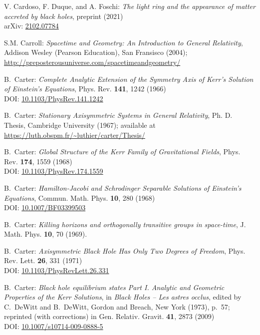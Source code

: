 \begin{thebibliography}{123}
V. Cardoso, F. Duque, and A. Foschi:
{\em The light ring and the appearance of matter accreted by black holes},
preprint (2021)\\
arXiv: \href{https://arxiv.org/abs/2102.07784}{2102.07784}

S.M. Carroll: \emph{Spacetime and Geometry: An Introduction to General Relativity},
Addison Wesley (Pearson Education), San Fransisco (2004); \\
\url{http://preposterousuniverse.com/spacetimeandgeometry/}

B.~Carter:
{\em Complete Analytic Extension of the Symmetry Axis of Kerr's Solution of Einstein's Equations},
Phys. Rev. {\bf 141}, 1242 (1966)\\
DOI: \href{https://doi.org/10.1103/PhysRev.141.1242}{10.1103/PhysRev.141.1242}

B.~Carter: {\em Stationary Axisymmetric Systems in General Relativity},
Ph. D. Thesis, Cambridge University (1967); available at\\
\url{https://luth.obspm.fr/~luthier/carter/Thesis/}

B.~Carter:
{\em Global Structure of the Kerr Family of Gravitational Fields},
Phys. Rev. {\bf 174}, 1559 (1968)\\
DOI: \href{https://doi.org/10.1103/PhysRev.174.1559}{10.1103/PhysRev.174.1559}

B.~Carter:
{\em Hamilton-Jacobi and Schrodinger Separable Solutions of Einstein's Equations},
Commun. Math. Phys. {\bf 10}, 280 (1968)\\
DOI: \href{https://doi.org/10.1007/BF03399503}{10.1007/BF03399503}

B.~Carter: {\em Killing horizons and orthogonally transitive groups
in space-time},
J. Math. Phys. {\bf 10}, 70 (1969).

B.~Carter: {\em Axisymmetric Black Hole Has Only Two Degrees of Freedom},
Phys. Rev. Lett. {\bf 26}, 331 (1971)\\
DOI: \href{https://doi.org/10.1103/PhysRevLett.26.331}{10.1103/PhysRevLett.26.331}

B.~Carter: {\em Black hole equilibrium states Part I.
Analytic and Geometric Properties of the Kerr Solutions},
in {\em Black Holes -- Les astres occlus},  edited by C.~DeWitt and B.~DeWitt,
Gordon and Breach, New York (1973), p.~57; reprinted (with corrections) in
Gen. Relativ. Gravit. {\bf 41}, 2873 (2009)\\
DOI: \href{https://doi.org/10.1007/s10714-009-0888-5}{10.1007/s10714-009-0888-5}


\end{thebibliography}
